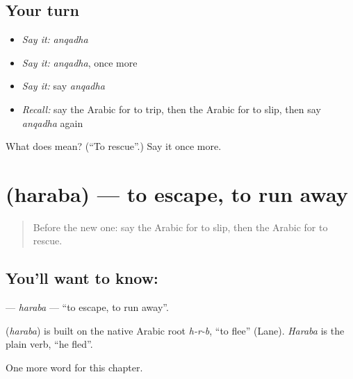 \subsection*{Your turn}
\begin{itemize}
\raggedright
  \item \emph{Say it:} \emph{anqadha}
  \item \emph{Say it:} \emph{anqadha}, once more
  \item \emph{Say it:} say \emph{anqadha}
  \item \emph{Recall:} say the Arabic for to trip, then the Arabic for to slip, then say \emph{anqadha} again
\end{itemize}

\begin{tcolorbox}[breakable,colback=teal!4,colframe=teal!35!black,title={Before you move on}]
What does  mean? (\textquotedblleft{}To rescue\textquotedblright{}.) Say it once more.
\end{tcolorbox}
\section[\texorpdfstring{\ar{هرب} (haraba)}{هرب (haraba)}]{ (haraba) — to escape, to run away}

\label{lesson:AR-C167-haraba}



\begin{quote}
Before the new one: say the Arabic for to slip, then the Arabic for to rescue.
\end{quote}

\subsection*{You'll want to know: }
\textbf{} — \emph{haraba} — \textquotedblleft{}to escape, to run away\textquotedblright{}.

\begin{cousinweb}
\textbf{} (\emph{haraba}) is built on the native Arabic root \emph{h-r-b}, \textquotedblleft{}to flee\textquotedblright{} (Lane). \emph{Haraba} is the plain verb, \textquotedblleft{}he fled\textquotedblright{}.
\end{cousinweb}

\begin{grammarlens}[title={What you've built}]
One more word for this chapter.
\end{grammarlens}

